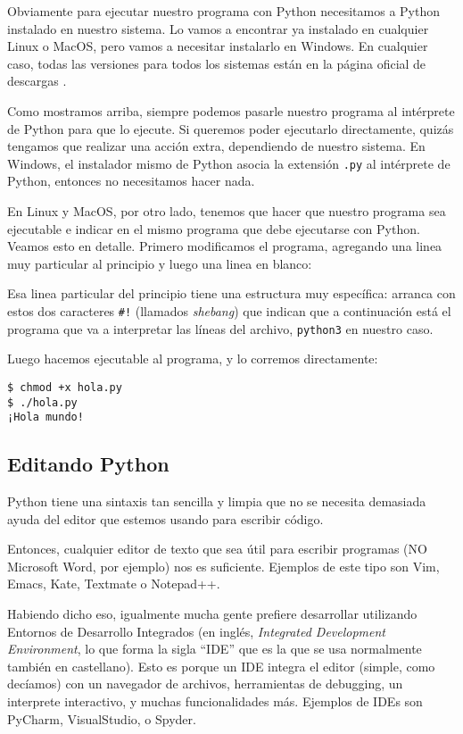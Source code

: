 Obviamente para ejecutar nuestro programa con Python necesitamos a Python instalado en nuestro sistema. Lo vamos a encontrar ya instalado en cualquier Linux o MacOS, pero vamos a necesitar instalarlo en Windows. En cualquier caso, todas las versiones para todos los sistemas están en la página oficial de descargas \cite{pydownloads}. 

Como mostramos arriba, siempre podemos pasarle nuestro programa al intérprete de Python para que lo ejecute. Si queremos poder ejecutarlo directamente, quizás tengamos que realizar una acción extra, dependiendo de nuestro sistema. En Windows, el instalador mismo de Python asocia la extensión \texttt{.py} al intérprete de Python, entonces no necesitamos hacer nada. 

En Linux y MacOS, por otro lado, tenemos que hacer que nuestro programa sea ejecutable e indicar en el mismo programa que debe ejecutarse con Python. Veamos esto en detalle. Primero modificamos el programa, agregando una linea muy particular al principio y luego una linea en blanco:


Esa linea particular del principio tiene una estructura muy específica: arranca con estos dos caracteres \verb|#!| (llamados \textit{shebang}) que indican que a continuación está el programa que va a interpretar las líneas del archivo, \texttt{python3} en nuestro caso.

Luego hacemos ejecutable al programa, y lo corremos directamente:

\begin{verbatim}
$ chmod +x hola.py
$ ./hola.py 
¡Hola mundo!
\end{verbatim}


\subsection{Editando Python}

Python tiene una sintaxis tan sencilla y limpia que no se necesita demasiada ayuda del editor que estemos usando para escribir código. 

Entonces, cualquier editor de texto que sea útil para escribir programas (NO Microsoft Word, por ejemplo) nos es suficiente. Ejemplos de este tipo son Vim, Emacs, Kate, Textmate o Notepad++.

Habiendo dicho eso, igualmente mucha gente prefiere desarrollar utilizando Entornos de Desarrollo Integrados (en inglés, \textit{Integrated Development Environment}, lo que forma la sigla ``IDE'' que es la que se usa normalmente también en castellano). Esto es porque un IDE integra el editor (simple, como decíamos) con un navegador de archivos, herramientas de debugging, un interprete interactivo, y muchas funcionalidades más. Ejemplos de IDEs son PyCharm, VisualStudio, o Spyder.

